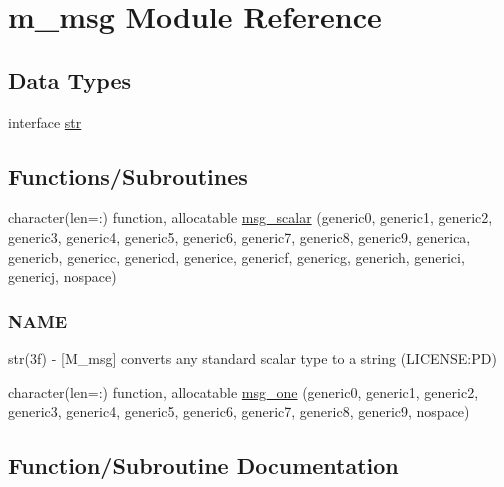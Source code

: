 \hypertarget{namespacem__msg}{}\section{m\+\_\+msg Module Reference}
\label{namespacem__msg}
\subsection*{Data Types}
\begin{DoxyCompactItemize}
\item 
interface \mbox{\hyperlink{interfacem__msg_1_1str}{str}}
\end{DoxyCompactItemize}
\subsection*{Functions/\+Subroutines}
\begin{DoxyCompactItemize}
\item 
character(len=\+:) function, allocatable \mbox{\hyperlink{namespacem__msg_a2e19921e3e57824c605acd4f7c83ad83}{msg\+\_\+scalar}} (generic0, generic1, generic2, generic3, generic4, generic5, generic6, generic7, generic8, generic9, generica, genericb, genericc, genericd, generice, genericf, genericg, generich, generici, genericj, nospace)
\begin{DoxyCompactList}\small\item\em \subsubsection*{N\+A\+ME}

str(3f) -\/ \mbox{[}M\+\_\+msg\mbox{]} converts any standard scalar type to a string (L\+I\+C\+E\+N\+SE\+:PD) \end{DoxyCompactList}\item 
character(len=\+:) function, allocatable \mbox{\hyperlink{namespacem__msg_a069f107ba79e88a43dd5c835080eff1a}{msg\+\_\+one}} (generic0, generic1, generic2, generic3, generic4, generic5, generic6, generic7, generic8, generic9, nospace)
\end{DoxyCompactItemize}


\subsection{Function/\+Subroutine Documentation}
\mbox{\label{namespacem__msg_a069f107ba79e88a43dd5c835080eff1a}} 
